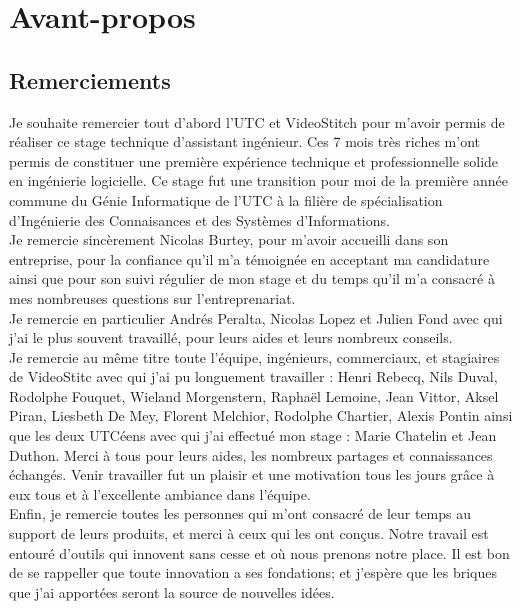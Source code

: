 \chapter*{Avant-propos}

\section*{Remerciements}
Je souhaite remercier tout d'abord l'UTC et VideoStitch pour m'avoir permis de 
réaliser ce stage technique d'assistant ingénieur. Ces 7 mois très riches m'ont 
permis de constituer une première expérience technique et professionnelle solide 
en ingénierie logicielle. Ce stage fut une transition pour moi de la première 
année commune du Génie Informatique de l'UTC à la filière de spécialisation 
d'Ingénierie des Connaisances et des Systèmes d'Informations.\\
\newline
Je remercie sincèrement Nicolas Burtey, pour m'avoir accueilli dans son entreprise,
pour la confiance qu'il m'a témoignée en acceptant ma candidature ainsi que pour
son suivi régulier de mon stage et du temps qu'il m'a consacré à mes nombreuses
questions sur l'entreprenariat.\\
Je remercie en particulier Andrés Peralta, Nicolas Lopez et Julien Fond avec qui 
j'ai le plus souvent travaillé, pour leurs aides et leurs nombreux conseils.\\
Je remercie au même titre toute l'équipe, ingénieurs, commerciaux, et stagiaires 
de VideoStitc avec qui j'ai pu longuement travailler :
Henri Rebecq, Nils Duval, Rodolphe Fouquet, Wieland Morgenstern, Raphaël 
Lemoine, Jean Vittor, Aksel Piran, Liesbeth De Mey, Florent Melchior, Rodolphe 
Chartier, Alexis Pontin ainsi que les deux UTCéens avec qui j'ai effectué mon 
stage : Marie Chatelin et Jean Duthon. Merci à tous pour leurs aides, 
les nombreux partages et connaissances échangés. Venir travailler fut un plaisir 
et une motivation tous les jours grâce à eux tous et à l'excellente ambiance dans l'équipe.\\
\newline
Enfin, je remercie toutes les personnes qui m'ont consacré de leur temps au support 
de leurs produits, et merci à ceux qui les ont conçus. Notre travail est entouré 
d'outils qui innovent sans cesse et où nous prenons notre place. Il est bon de 
se rappeller que toute innovation a ses fondations; et j'espère que les briques 
que j'ai apportées seront la source de nouvelles idées.



